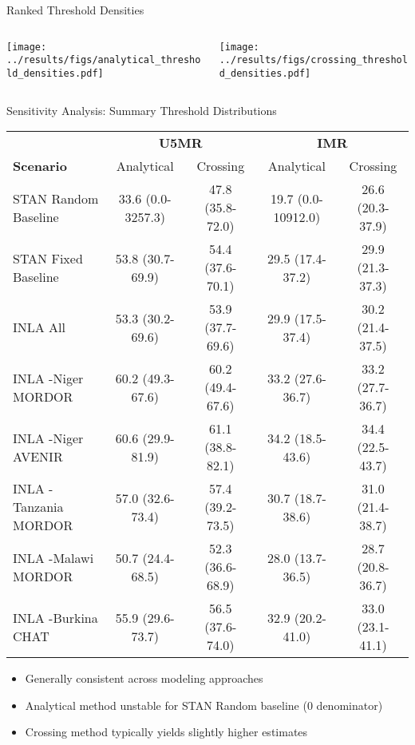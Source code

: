 \documentclass[aspectratio=169]{beamer}\usepackage[]{graphicx}\usepackage[dvipsnames]{xcolor}
\begin{document}
\begin{frame}{Ranked Threshold Densities}
\begin{columns}
\begin{column}{0.5\textwidth}
\begin{center}
\texttt{[image: ../results/figs/analytical\_threshold\_densities.pdf]}
\end{center}
\end{column}
\begin{column}{0.5\textwidth}
\begin{center}
\texttt{[image: ../results/figs/crossing\_threshold\_densities.pdf]}
\end{center}
\end{column}
\end{columns}
\end{frame}

\begin{frame}{Sensitivity Analysis: Summary Threshold Distributions}
\begin{center}\footnotesize\begin{tabular}{l|cc|cc}\toprule& \multicolumn{2}{c}{\textbf{U5MR}} & \multicolumn{2}{c}{\textbf{IMR}} \\\textbf{Scenario} & Analytical & Crossing & Analytical & Crossing \\\midrule STAN Random Baseline & 33.6 (0.0-3257.3) & 47.8 (35.8-72.0) & 19.7 (0.0-10912.0) & 26.6 (20.3-37.9) \\STAN Fixed Baseline & 53.8 (30.7-69.9) & 54.4 (37.6-70.1) & 29.5 (17.4-37.2) & 29.9 (21.3-37.3) \\INLA All & 53.3 (30.2-69.6) & 53.9 (37.7-69.6) & 29.9 (17.5-37.4) & 30.2 (21.4-37.5) \\INLA -Niger MORDOR & 60.2 (49.3-67.6) & 60.2 (49.4-67.6) & 33.2 (27.6-36.7) & 33.2 (27.7-36.7) \\INLA -Niger AVENIR & 60.6 (29.9-81.9) & 61.1 (38.8-82.1) & 34.2 (18.5-43.6) & 34.4 (22.5-43.7) \\INLA -Tanzania MORDOR & 57.0 (32.6-73.4) & 57.4 (39.2-73.5) & 30.7 (18.7-38.6) & 31.0 (21.4-38.7) \\INLA -Malawi MORDOR & 50.7 (24.4-68.5) & 52.3 (36.6-68.9) & 28.0 (13.7-36.5) & 28.7 (20.8-36.7) \\INLA -Burkina CHAT & 55.9 (29.6-73.7) & 56.5 (37.6-74.0) & 32.9 (20.2-41.0) & 33.0 (23.1-41.1) \\\bottomrule\end{tabular}\end{center}

\vspace{0.3cm}
\begin{itemize}
  \item Generally consistent across modeling approaches
  \item Analytical method unstable for STAN Random baseline (0 denominator)
  \item Crossing method typically yields slightly higher estimates
\end{itemize}
\end{frame}
\end{document}

